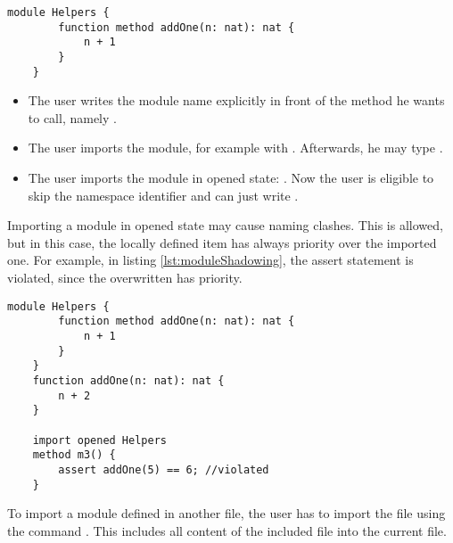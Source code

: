 \begin{lstlisting}[language=dafny, caption={Module Example}, captionpos=b, label={lst:addOneMethod}]
    module Helpers {
        function method addOne(n: nat): nat {
            n + 1
        }
    }
\end{lstlisting}

\begin{itemize}
    \item The user writes the module name explicitly in front of the method he wants to call, \linebreak namely .
    \item The user imports the module, for example with . Afterwards, he may type .
    \item The user imports the module in opened state: . Now the user is eligible to skip the namespace identifier and can just write .
\end{itemize}

Importing a module in opened state may cause naming clashes. This is allowed, but in this case, the locally defined item has always priority over the imported one. For example, in listing \ref{lst:moduleShadowing}, the assert statement is violated, since the overwritten  has priority. \cite{functionVSMethod}

\begin{lstlisting}[language = dafny, caption={Naming Clash}, captionpos=b, label={lst:moduleShadowing}]
    module Helpers {
        function method addOne(n: nat): nat {
            n + 1
        }
    }
    function addOne(n: nat): nat {
        n + 2
    }

    import opened Helpers
    method m3() {
        assert addOne(5) == 6; //violated
    }

\end{lstlisting}

To import a module defined in another file, the user has to import the file using the command . This includes all content of the included file into the current file.


